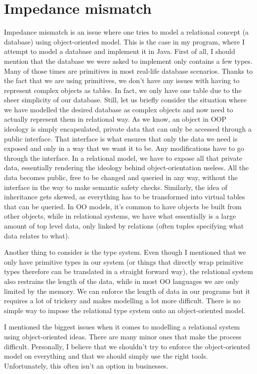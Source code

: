 \documentclass{report}
\begin{document}
\section*{Impedance mismatch}
Impedance mismatch is an issue where one tries to model a relational
concept (a database) using object-oriented model. This is the case in
my program, where I attempt to model a database and implement it in
Java. First of all, I should mention that the database we were asked
to implement only contains a few types. Many of those times are
primitives in most real-life database scenarios. Thanks to the fact
that we are using primitives, we don't have any issues with having to
represent complex objects as tables. In fact, we only have one table
due to the sheer simplicity of our database. Still, let us briefly
consider the situation where we have modelled the desired database as
complex objects and now need to actually represent them in relational
way. As we know, an object in OOP ideology is simply encapsulated,
private data that can only be accessed through a public interface.
That interface is what ensures that only the data we need is exposed
and only in a way that we want it to be. Any modifications have to go
through the interface. In a relational model, we have to expose all
that private data, essentially rendering the ideology behind
object-orientation useless. All the data becomes public, free to be
changed and queried in any way, without the interface in the way to
make semantic safety checks. Similarly, the idea of inheritance gets
skewed, as everything has to be transformed into virtual tables that
can be queried. In OO models, it's common to have objects be built
from other objects, while in relational systems, we have what
essentially is a large amount of top level data, only linked by
relations (often tuples specifying what data relates to what).

Another thing to consider is the type system. Even though I mentioned
that we only have primitive types in our system (or things that
directly wrap primitive types therefore can be translated in a
straight forward way), the relational system also restrains the length
of the data, while in most OO languages we are only limited by the
memory. We can enforce the length of data in our programs but it
requires a lot of trickery and makes modelling a lot more difficult.
There is no simple way to impose the relational type system onto an
object-oriented model.

I mentioned the biggest issues when it comes to modelling a relational
system using object-oriented ideas. There are many minor ones that
make the process difficult. Personally, I believe that we shouldn't
try to enforce the object-oriented model on everything and that we
should simply use the right tools. Unfortunately, this often isn't an
option in businesses.
\end{document}
